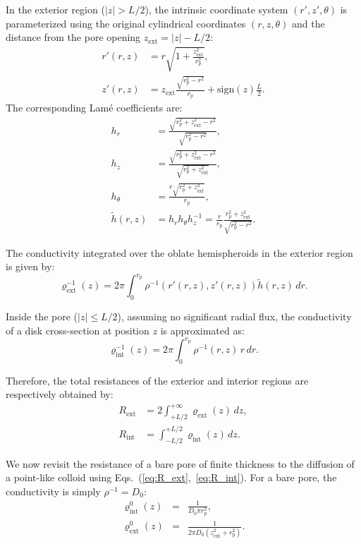 \documentclass[10pt, a4paper]{article}
\begin{document}
\begin{multicols}{2}
In the exterior region ($|z| > L/2$), the intrinsic coordinate system $(r', z', \theta)$ is parameterized using the original cylindrical coordinates $(r,z,\theta)$ and the distance from the pore opening $z_{\text{ext}} = |z| - L/2$:
\begin{align}
    r'(r,z) &= r\sqrt{1 + \frac{z_{\text{ext}}^2}{r_{\text{p}}^2}},\\[4pt]
    z'(r,z) &= z_{\text{ext}}\frac{\sqrt{r_{\text{p}}^2 - r^2}}{r_{\text{p}}} + \text{sign}(z)\frac{L}{2}.
\end{align}
The corresponding Lam\'e  coefficients are:
\begin{align}
    h_r &= \frac{\sqrt{r_{\text{p}}^2 + z_{\text{ext}}^2 - r^2}}{\sqrt{r_{\text{p}}^2 - r^2}},\\[4pt]
    h_z &= \frac{\sqrt{r_{\text{p}}^2 + z_{\text{ext}}^2 - r^2}}{\sqrt{r_{\text{p}}^2 + z_{\text{ext}}^2}},\\[4pt]
    h_{\theta} &= \frac{r\sqrt{r_{\text{p}}^2 + z_{\text{ext}}^2}}{r_{\text{p}}},\\[4pt]
    \tilde{h}(r,z) &= h_r h_{\theta} h_z^{-1} = \frac{r}{r_{\text{p}}}\frac{r_{\text{p}}^2 + z_{\text{ext}}^2}{\sqrt{r_{\text{p}}^2 - r^2}}.
\end{align}

The conductivity integrated over the oblate hemispheroids in the exterior region is given by:
\begin{equation}
  \label{eq:rho_ext}
  \varrho_{\text{ext}}^{-1}(z)= 2\pi\int_{0}^{r_{\text{p}}^{}} 
  \rho^{-1}\left( r'(r,z), z'(r,z) \right)\tilde{h}(r,z)\,dr.
\end{equation}

Inside the pore ($|z|\leq L/2$), assuming no significant radial flux, the conductivity of a disk cross-section at position $z$ is approximated as:
\begin{equation}
  \varrho_{\text{int}}^{-1}(z)= 2\pi\int_{0}^{r_{\text{p}}^{}} \rho^{-1}(r,z)\,r\,dr.
\end{equation}

Therefore, the total resistances of the exterior and interior regions are respectively obtained by:
\begin{align}
   \label{eq:R_ext}
   R_{\text{ext}} &=2\int_{+L/2}^{+\infty}\varrho_{\text{ext}}(z)\,dz,\\[5pt]
   \label{eq:R_int}
   R_{\text{int}} &=\int_{-L/2}^{+L/2}\varrho_{\text{int}}(z)\,dz.
\end{align}

We now revisit the resistance of a bare pore of finite thickness to the diffusion of a point-like colloid using Eqs.~(\ref{eq:R_ext},~\ref{eq:R_int}).
For a bare pore, the conductivity is simply $\rho^{-1} = D_0$:
\begin{eqnarray}
    \varrho^{0}_{\text{int}}(z) &=& \frac{1}{D_0 \pi r_{\text{p}}^2},\\[4pt]
    \varrho^{0}_{\text{ext}}(z) &=& \frac{1}{2\pi D_0\left(z_{\text{ext}}^2 + r_{\text{p}}^2\right)}.
\end{eqnarray}


\end{multicols}
\end{document}
